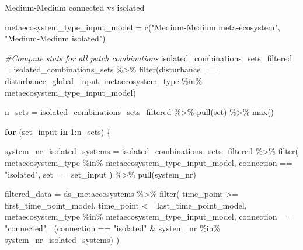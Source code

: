 \documentclass[
]{article}
\newenvironment{Shaded}{\begin{snugshade}}{\end{snugshade}}
\newcommand{\CommentTok}[1]{\textcolor[rgb]{0.56,0.35,0.01}{\textit{#1}}}
\newcommand{\ControlFlowTok}[1]{\textcolor[rgb]{0.13,0.29,0.53}{\textbf{#1}}}
\newcommand{\DecValTok}[1]{\textcolor[rgb]{0.00,0.00,0.81}{#1}}
\newcommand{\FunctionTok}[1]{\textcolor[rgb]{0.00,0.00,0.00}{#1}}
\newcommand{\NormalTok}[1]{#1}
\newcommand{\OtherTok}[1]{\textcolor[rgb]{0.56,0.35,0.01}{#1}}
\newcommand{\SpecialCharTok}[1]{\textcolor[rgb]{0.00,0.00,0.00}{#1}}
\newcommand{\StringTok}[1]{\textcolor[rgb]{0.31,0.60,0.02}{#1}}
\begin{document}
Medium-Medium connected vs isolated

\begin{Shaded}
\begin{Highlighting}[]
\NormalTok{metaecosystem\_type\_input\_model }\OtherTok{=} \FunctionTok{c}\NormalTok{(}\StringTok{"Medium{-}Medium meta{-}ecosystem"}\NormalTok{,}
                                   \StringTok{"Medium{-}Medium isolated"}\NormalTok{)}
\end{Highlighting}
\end{Shaded}

\begin{Shaded}
\begin{Highlighting}[]
\CommentTok{\#Compute stats for all patch combinations }
\NormalTok{isolated\_combinations\_sets\_filtered }\OtherTok{=}\NormalTok{  isolated\_combinations\_sets }\SpecialCharTok{\%\textgreater{}\%}
  \FunctionTok{filter}\NormalTok{(disturbance }\SpecialCharTok{==}\NormalTok{ disturbance\_global\_input,}
\NormalTok{         metaecosystem\_type }\SpecialCharTok{\%in\%}\NormalTok{ metaecosystem\_type\_input\_model)}

\NormalTok{n\_sets }\OtherTok{=}\NormalTok{ isolated\_combinations\_sets\_filtered }\SpecialCharTok{\%\textgreater{}\%}
  \FunctionTok{pull}\NormalTok{(set) }\SpecialCharTok{\%\textgreater{}\%}
  \FunctionTok{max}\NormalTok{()}

\ControlFlowTok{for}\NormalTok{ (set\_input }\ControlFlowTok{in} \DecValTok{1}\SpecialCharTok{:}\NormalTok{n\_sets) \{}
  
\NormalTok{  system\_nr\_isolated\_systems }\OtherTok{=}\NormalTok{ isolated\_combinations\_sets\_filtered }\SpecialCharTok{\%\textgreater{}\%}
    \FunctionTok{filter}\NormalTok{(}
\NormalTok{      metaecosystem\_type }\SpecialCharTok{\%in\%}\NormalTok{ metaecosystem\_type\_input\_model,}
\NormalTok{      connection }\SpecialCharTok{==} \StringTok{"isolated"}\NormalTok{,}
\NormalTok{      set }\SpecialCharTok{==}\NormalTok{ set\_input}
\NormalTok{    ) }\SpecialCharTok{\%\textgreater{}\%}
    \FunctionTok{pull}\NormalTok{(system\_nr)}
  
\NormalTok{  filtered\_data }\OtherTok{=}\NormalTok{ ds\_metaecosystems }\SpecialCharTok{\%\textgreater{}\%}
    \FunctionTok{filter}\NormalTok{(}
\NormalTok{      time\_point }\SpecialCharTok{\textgreater{}=}\NormalTok{ first\_time\_point\_model,}
\NormalTok{      time\_point }\SpecialCharTok{\textless{}=}\NormalTok{ last\_time\_point\_model,}
\NormalTok{      metaecosystem\_type }\SpecialCharTok{\%in\%}\NormalTok{ metaecosystem\_type\_input\_model,}
\NormalTok{      connection }\SpecialCharTok{==} \StringTok{"connected"} \SpecialCharTok{|}
\NormalTok{        (connection }\SpecialCharTok{==} \StringTok{"isolated"} \SpecialCharTok{\&}
\NormalTok{           system\_nr }\SpecialCharTok{\%in\%}\NormalTok{ system\_nr\_isolated\_systems)}
\NormalTok{    )}
  

\end{Highlighting}
\end{Shaded}
\end{document}
